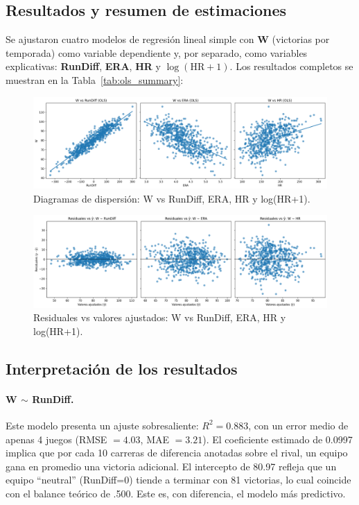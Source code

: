 \documentclass[10pt]{article}
\begin{document}
\subsection{Resultados y resumen de estimaciones}

Se ajustaron cuatro modelos de regresión lineal simple con \textbf{W} (victorias por temporada) 
como variable dependiente y, por separado, como variables explicativas: \textbf{RunDiff}, \textbf{ERA}, \textbf{HR} y \textbf{\(\log(\text{HR}+1)\)}. 
Los resultados completos se muestran en la Tabla~\ref{tab:ols_summary}:



\begin{figure}[H]
    \centering
    \includegraphics[width=\textwidth]{../plots/ols_scatter_grid_RunDiff_ERA_HR.png}
    \caption{Diagramas de dispersión: W vs RunDiff, ERA, HR y log(HR+1).}
\end{figure}

\begin{figure}[H]
    \centering
    \includegraphics[width=\textwidth]{../plots/ols_resid_grid_RunDiff_ERA_HR.png}
    \caption{Residuales vs valores ajustados: W vs RunDiff, ERA, HR y log(HR+1).}
\end{figure}

\subsection{Interpretación de los resultados}

\paragraph{W \(\sim\) RunDiff.}  
Este modelo presenta un ajuste sobresaliente: \(R^2=0.883\), con un error medio de apenas 4 juegos (RMSE \(=4.03\), MAE \(=3.21\)). El coeficiente estimado de 0.0997 implica que por cada 10 carreras de diferencia anotadas sobre el rival, un equipo gana en promedio una victoria adicional. El intercepto de 80.97 refleja que un equipo “neutral” (RunDiff=0) tiende a terminar con 81 victorias, lo cual coincide con el balance teórico de .500. Este es, con diferencia, el modelo más predictivo.
\end{document}
